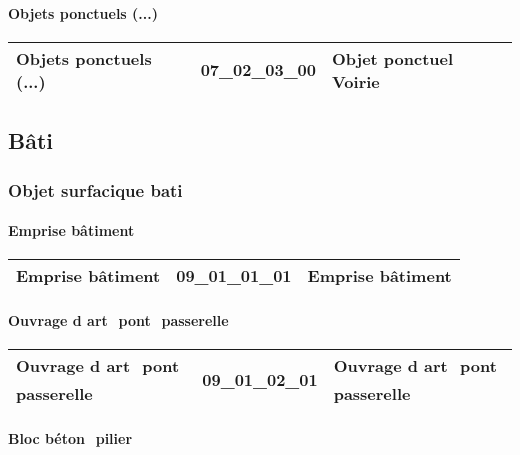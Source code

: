 \documentclass[12pt,titlepage,oneside]{book}
\begin{document}
\paragraph{Objets ponctuels (...)}
\noindent
\vspace{\baselineskip}

\renewcommand{\arraystretch}{1.2}
\begin{supertabular}{|p{10cm}|c|p{15cm}|}
 Objets ponctuels (...) & 07\_02\_03\_00 & Objet ponctuel Voirie\\
\hline
\end{supertabular}
\subsection{Bâti}
\subsubsection{\large Objet surfacique bati}
\paragraph{Emprise bâtiment}
\noindent
\vspace{\baselineskip}

\renewcommand{\arraystretch}{1.2}
\begin{supertabular}{|p{10cm}|c|p{15cm}|}
 Emprise bâtiment & 09\_01\_01\_01 & Emprise bâtiment\\
\hline
\end{supertabular}


\paragraph{Ouvrage d art  pont  passerelle}
\noindent
\vspace{\baselineskip}

\renewcommand{\arraystretch}{1.2}
\begin{supertabular}{|p{10cm}|c|p{15cm}|}
 Ouvrage d art  pont  passerelle & 09\_01\_02\_01 & Ouvrage d art  pont  passerelle\\
\hline
\end{supertabular}


\paragraph{Bloc béton  pilier}
\noindent
\vspace{\baselineskip}
\end{document}
